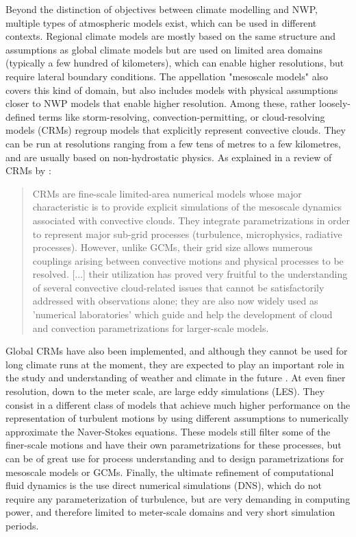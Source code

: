 \hfill

Beyond the distinction of objectives between climate modelling and NWP, multiple types of atmospheric models exist, which can be used in different contexts.
Regional climate models are mostly based on the same structure and assumptions as global climate models but are used on limited area domains (typically a few hundred of kilometers), which can enable higher resolutions, but require lateral boundary conditions.
The appellation "mesoscale models" also covers this kind of domain, but also includes models with physical assumptions closer to NWP models that enable higher resolution.
Among these, rather loosely-defined terms like storm-resolving, convection-permitting, or cloud-resolving models (CRMs) regroup models that explicitly represent convective clouds. They can be run at resolutions ranging from a few tens of metres to a few kilometres, and are usually based on non-hydrostatic physics.
As explained in a review of CRMs by \citet{guichard_short_2017}:
\begin{quote}
    CRMs are fine-scale limited-area numerical models whose major characteristic is to provide explicit simulations of the mesoscale dynamics associated with convective clouds. They integrate parametrizations in order to represent major sub-grid processes (turbulence, microphysics, radiative processes). However, unlike GCMs, their grid size allows numerous couplings arising between convective motions and physical processes to be resolved. [...] their utilization has proved very fruitful to the understanding of several convective cloud-related issues that cannot be satisfactorily addressed with observations alone; they are also now widely used as 'numerical laboratories' which guide and help the development of cloud and convection parametrizations for larger-scale models.
\end{quote}
Global CRMs have also been implemented, and although they cannot be used for long climate runs at the moment, they are expected to play an important role in the study and understanding of weather and climate in the future \citep{satoh_global_2019}.
At even finer resolution, down to the meter scale, are large eddy simulations (LES). They consist in a different class of models that achieve much higher performance on the representation of turbulent motions by using different assumptions to numerically approximate the Naver-Stokes equations. These models still filter some of the finer-scale motions and have their own parametrizations for these processes, but can be of great use for process understanding and to design parametrizations for mesoscale models or GCMs. 
Finally, the ultimate refinement of computational fluid dynamics is the use direct numerical simulations (DNS), which do not require any parameterization of turbulence, but are very demanding in computing power, and therefore limited to meter-scale domains and very short simulation periods.


